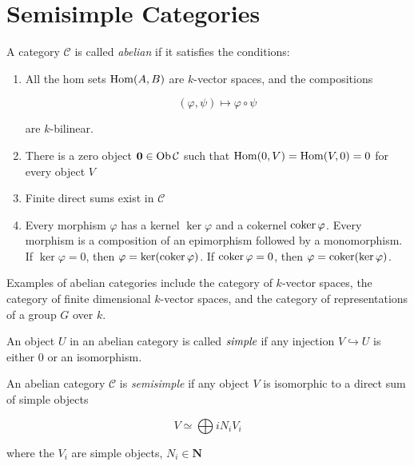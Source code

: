 \section{Semisimple Categories}
\begin{defn}
    A category $\mathcal{C}$ is called \emph{abelian} if it satisfies the conditions:

    \begin{enumerate}
    \renewcommand{\labelenumi}{\roman{enumi})}
        \item All the hom sets $\operatorname{Hom}(A,B)$ are $k$-vector spaces, and the compositions
            
            \begin{equation}
                (\varphi, \psi) \mapsto \varphi \circ \psi
            \end{equation}

            are $k$-bilinear.
        \item There is a zero object $\mathbf{0} \in \operatorname{Ob} \mathcal{C}$ such that
            $\operatorname{Hom}(0,V) = \operatorname{Hom}(V,0) = 0$ for every object $V$
        \item Finite direct sums exist in $\mathcal{C}$
        \item Every morphism $\varphi$ has a kernel $\ker \varphi$ and a
            cokernel $\operatorname{coker} \varphi$. Every morphism is a composition of an
            epimorphism followed by a monomorphism. If $\ker \varphi = 0$, then
            $\varphi = \ker(\operatorname{coker} \varphi)$. If $\operatorname{coker} \varphi = 0$, then
            $\varphi = \operatorname{coker}(\ker \varphi)$.
    \end{enumerate}

    Examples of abelian categories include the category of $k$-vector spaces,
    the category of finite dimensional $k$-vector spaces, and the category of
    representations of a group $G$ over $k$.

\end{defn}

\begin{defn}
    An object $U$ in an abelian category is called $\emph{simple}$ if any
    injection $V \hookrightarrow U$ is either $0$ or an isomorphism.
\end{defn}

\begin{defn}
    An abelian category $\mathcal{C}$ is \emph{semisimple} if any object $V$ is isomorphic to a direct sum of simple objects

    \begin{equation}
        V \simeq \bigoplus{i} N_i V_i
    \end{equation}

    where the $V_i$ are simple objects, $N_i \in \mathbf{N}$

\end{defn}

